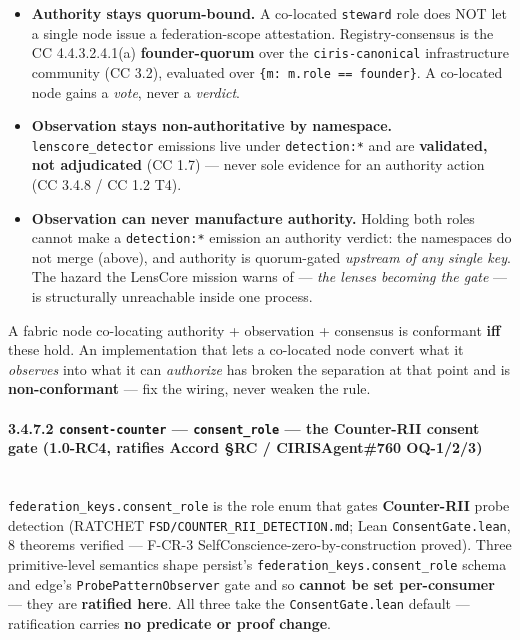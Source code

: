 \documentclass[11pt]{article}
\begin{document}
\begin{itemize}\setlength\itemsep{0pt}
\item \textbf{Authority stays quorum-bound.} A co-located \texttt{steward} role does NOT let a single node issue a federation-scope attestation. Registry-consensus is the CC 4.4.3.2.4.1(a) \textbf{founder-quorum} over the \texttt{ciris-canonical} infrastructure community (CC 3.2), evaluated over \texttt{\{m: m.role == founder\}}. A co-located node gains a \textit{vote}, never a \textit{verdict}.
\item \textbf{Observation stays non-authoritative by namespace.} \texttt{lenscore\_detector} emissions live under \texttt{detection:*} and are \textbf{validated, not adjudicated} (CC 1.7) — never sole evidence for an authority action (CC 3.4.8 / CC 1.2 T4).
\item \textbf{Observation can never manufacture authority.} Holding both roles cannot make a \texttt{detection:*} emission an authority verdict: the namespaces do not merge (above), and authority is quorum-gated \textit{upstream of any single key}. The hazard the LensCore mission warns of — \textit{the lenses becoming the gate} — is structurally unreachable inside one process.
\end{itemize}


A fabric node co-locating authority + observation + consensus is conformant \textbf{iff} these hold. An implementation that lets a co-located node convert what it \textit{observes} into what it can \textit{authorize} has broken the separation at that point and is \textbf{non-conformant} — fix the wiring, never weaken the rule.


\paragraph{3.4.7.2 \texttt{consent-counter} — \texttt{consent\_role} — the Counter-RII consent gate (1.0-RC4, ratifies Accord §RC / CIRISAgent\#760 OQ-1/2/3)}\mbox{}\\


\texttt{federation\_keys.consent\_role} is the role enum that gates \textbf{Counter-RII} probe detection (RATCHET \texttt{FSD/COUNTER\_RII\_DETECTION.md}; Lean \texttt{ConsentGate.lean}, 8 theorems verified — F-CR-3 SelfConscience-zero-by-construction proved). Three primitive-level semantics shape persist's \texttt{federation\_keys.consent\_role} schema and edge's \texttt{ProbePatternObserver} gate and so \textbf{cannot be set per-consumer} — they are \textbf{ratified here}. All three take the \texttt{ConsentGate.lean} default — ratification carries \textbf{no predicate or proof change}.
\end{document}
